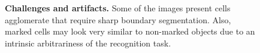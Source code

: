 \clearpage
{}
\begin{landscape}
\begin{figure}[!b]
    \centering
    \caption{\textbf{Challenges and artifacts.}
    Some of the images present cells agglomerate that require sharp boundary segmentation. 
    Also, marked cells may look very similar to non-marked objects due to an intrinsic arbitrariness of the recognition task.
    }
    \label{fig:artifacts}
\end{figure}%


\end{landscape}
